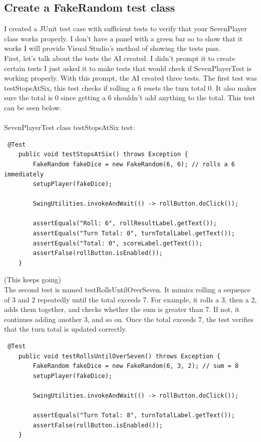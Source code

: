 \documentclass[a4paper,11pt]{article}
\begin{document}
\subsection*{Create a FakeRandom test class}
I created a JUnit test case with sufficient tests to verify that your SevenPlayer class works properly. I don't have a panel with a green bar so to show that it works I will provide Visual Studio's method of showing the tests pass. \\
First, let's talk about the tests the AI created. I didn't prompt it to create certain tests I just asked it to make tests that would check if SevenPlayerTest is working properly. With this prompt, the AI created three tests. The first test was testStopsAtSix, this test checks if rolling a 6 resets the turn total 0. It also makes sure the total is 0 since getting a 6 shouldn't add anything to the total. This test can be seen below.\\\\
SevenPlayerTest class testStopsAtSix test:
\begin{lstlisting}
 @Test
    public void testStopsAtSix() throws Exception {
        FakeRandom fakeDice = new FakeRandom(6, 6); // rolls a 6 immediately
        setupPlayer(fakeDice);

        SwingUtilities.invokeAndWait(() -> rollButton.doClick());

        assertEquals("Roll: 6", rollResultLabel.getText());
        assertEquals("Turn Total: 0", turnTotalLabel.getText());
        assertEquals("Total: 0", scoreLabel.getText());
        assertFalse(rollButton.isEnabled());
    }
\end{lstlisting} (This keeps going)\\
The second test is named testRollsUntilOverSeven. It mimics rolling a sequence of 3 and 2 repeatedly until the total exceeds 7. For example, it rolls a 3, then a 2, adds them together, and checks whether the sum is greater than 7. If not, it continues adding another 3, and so on. Once the total exceeds 7, the test verifies that the turn total is updated correctly.
\begin{lstlisting}
 @Test
    public void testRollsUntilOverSeven() throws Exception {
        FakeRandom fakeDice = new FakeRandom(6, 3, 2); // sum = 8
        setupPlayer(fakeDice);

        SwingUtilities.invokeAndWait(() -> rollButton.doClick());

        assertEquals("Turn Total: 8", turnTotalLabel.getText());
        assertFalse(rollButton.isEnabled());
    }
\end{lstlisting}
\end{document}
